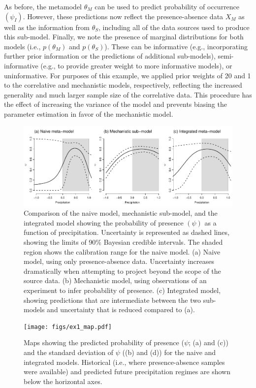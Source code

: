 \documentclass[11pt]{article}
\begin{document}
As before, the metamodel \(\theta_M\) can be used to predict probability of occurrence \((\psi_I)\).
However, these predictions now reflect the presence-absence data \(X_M\) as well as the information from \(\theta_S\), including all of the data sources used to produce this sub-model.
Finally, we note the presence of marginal distributions for both models (i.e., \(p(\theta_M)\) and \(p(\theta_S)\)).
These can be informative (e.g., incorporating further prior information or the predictions of additional sub-models), semi-informative (e.g., to provide greater weight to more informative models), or uninformative.
For purposes of this example, we applied prior weights of 20 and 1 to the correlative and mechanistic models, respectively, reflecting the increased generality and much larger sample size of the correlative data.
This procedure has the effect of increasing the variance of the model and prevents biasing the parameter estimation in favor of the mechanistic model.

\begin{figure}[bt]
	\includegraphics{figs/ex1_precip.pdf}
	\caption{Comparison of the naive model, mechanistic sub-model, and the integrated model showing the probability of presence $(\psi)$ as a function of precipitation.
	Uncertainty is represented as dashed lines, showing the limits of 90\% Bayesian credible intervals.
	The shaded region shows the calibration range for the naive model.
	(a) Naive model, using only presence-absence data. Uncertainty increases dramatically when attempting to project beyond the scope of the source data.
	(b) Mechanistic model, using observations of an experiment to infer probability of presence.
	(c) Integrated model, showing predictions that are intermediate between the two sub-models and uncertainty that is reduced compared to (a).
	}
	\label{fig:ex1_precip}
\end{figure}


\begin{figure}[tb]
	\texttt{[image: figs/ex1\_map.pdf]}
	\caption{Maps showing the predicted probability of presence (\(\psi\); (a) and (c)) and the standard deviation of \(\psi\) ((b) and (d)) for the naive and integrated models.
	Historical (i.e., where presence-absence samples were available) and predicted future precipitation regimes are shown below the horizontal axes.
}
	\label{fig:ex1_map}
\end{figure}
\end{document}
